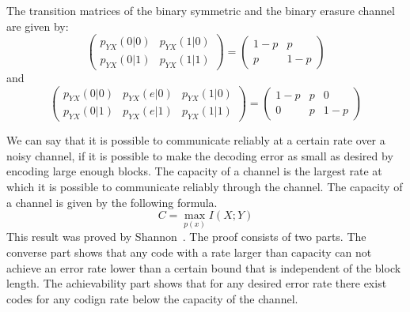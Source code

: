 \begin{example}
The transition matrices of the binary symmetric and the binary erasure channel are given by:
\begin{equation}
\begin{pmatrix}
p_{YX}(0|0) &p_{YX}(1|0) \\
p_{YX}(0|1) &p_{YX}(1|1) 
\end{pmatrix}
=
\begin{pmatrix}
1-p&p \\
p &1-p 
\end{pmatrix}
\end{equation}
and
\begin{equation}
\begin{pmatrix}
p_{YX}(0|0) &p_{YX}(e|0)&p_{YX}(1|0)  \\
p_{YX}(0|1) &p_{YX}(e|1)&p_{YX}(1|1) 
\end{pmatrix}
=
\begin{pmatrix}
1-p&p&0  \\
0 &p&1-p
\end{pmatrix}
\end{equation}
\end{example}

We can say that it is possible to communicate reliably at a certain rate over a noisy channel, if it is possible to make the decoding error as small as desired by encoding large enough blocks. The capacity of a channel is the largest rate at which it is possible to communicate reliably through the channel. The capacity of a channel is given by the following formula.
\begin{equation}
\label{eq:capform}
C = \max_{p(x)} I(X;Y)
\end{equation}
This result was proved by Shannon~\cite{Shannon_48}. The proof consists of two parts. The converse part shows that any code with a rate larger than capacity can not achieve an error rate lower than a certain bound that is independent of the block length. The achievability part shows that for any desired error rate there exist codes for any codign rate below the capacity of the channel. 

\iffalse
